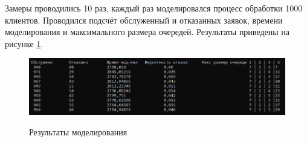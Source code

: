 Замеры проводились 10 раз, каждый раз моделировался процесс обработки 1000 клиентов. Проводился подсчёт обслуженный и отказанных заявок, времени моделирования и максимального размера очередей. Результаты приведены на рисунке \ref{fig3:image}.

\begin{figure}[h]
	\begin{center}
		{\includegraphics[scale = 0.75]{img/results.png}}
		\caption{Результаты моделирования}
		\label{fig3:image}
	\end{center}
\end{figure}